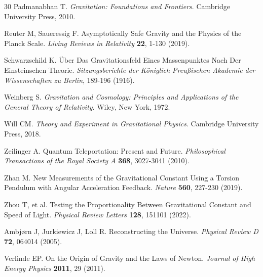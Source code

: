 \documentclass[12pt,twocolumn]{article}
\begin{document}
\begin{thebibliography}{30}
Padmanabhan T. \emph{Gravitation: Foundations and Frontiers}. Cambridge University Press, 2010.

Reuter M, Saueressig F. Asymptotically Safe Gravity and the Physics of the Planck Scale. \emph{Living Reviews in Relativity} \textbf{22}, 1-130 (2019).

Schwarzschild K. Über Das Gravitationsfeld Eines Massenpunktes Nach Der Einsteinschen Theorie. \emph{Sitzungsberichte der Königlich Preußischen Akademie der Wissenschaften zu Berlin}, 189-196 (1916).

Weinberg S. \emph{Gravitation and Cosmology: Principles and Applications of the General Theory of Relativity}. Wiley, New York, 1972.

Will CM. \emph{Theory and Experiment in Gravitational Physics}. Cambridge University Press, 2018.

Zeilinger A. Quantum Teleportation: Present and Future. \emph{Philosophical Transactions of the Royal Society A} \textbf{368}, 3027-3041 (2010).

Zhan M. New Measurements of the Gravitational Constant Using a Torsion Pendulum with Angular Acceleration Feedback. \emph{Nature} \textbf{560}, 227-230 (2019).

Zhou T, et al. Testing the Proportionality Between Gravitational Constant and Speed of Light. \emph{Physical Review Letters} \textbf{128}, 151101 (2022).

Ambjørn J, Jurkiewicz J, Loll R. Reconstructing the Universe. \emph{Physical Review D} \textbf{72}, 064014 (2005).

Verlinde EP. On the Origin of Gravity and the Laws of Newton. \emph{Journal of High Energy Physics} \textbf{2011}, 29 (2011).

\end{thebibliography}
\end{document}
